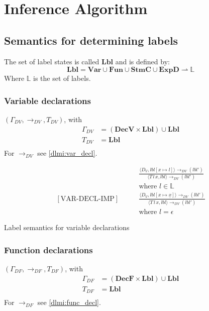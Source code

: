 
\newcommand{\iVar}{\mathbf{Var}}
\newcommand{\iFun}{\mathbf{Fun}}
\newcommand{\iDecv}{\mathbf{DecV}}
\newcommand{\iDecf}{\mathbf{DecF}}
\newcommand{\iStmc}{\mathbf{StmC}}
\newcommand{\iExpd}{\mathbf{ExpD}}
\newcommand{\iLbl}{\mathbf{Lbl}}

\newcommand{\trtspc}{\hspace{2em}} %

\section{Inference Algorithm}

\subsection{Semantics for determining labels}
The set of label states is called $\iLbl$ and is defined by:
\[
  \iLbl = \iVar \cup \iFun \cup \iStmc \cup \iExpd \rightharpoonup \mathbb{L}
\]
Where $\mathbb{L}$ is the set of labels.

\subsubsection{Variable declarations}
$(\Gamma_{DV}, \rightarrow_{DV}, T_{DV})$, with
\begin{align*}
  \Gamma_{DV} & = (\iDecv \times \iLbl) \cup \iLbl \\
  T_{DV} & = \iLbl \\
\end{align*}
For $\rightarrow_{DV}$ see \cref{dlmi:var_decl}.

\begin{table}
\begin{align*}
  [\text{VAR-DECL-EXP}] \trtspc & \frac{
    \langle D_V, lbl[x \mapsto l] \rangle \rightarrow_{DV} (lbl')
  }{
    \langle T \, l \, x, lbl \rangle \rightarrow_{DV} (lbl')
  }\\
  & \text{where } l \in \mathbb{L}\\[2em]
  [\text{VAR-DECL-IMP}] \trtspc & \frac{
    \langle D_V, lbl[x \mapsto \underline{x}] \rangle \rightarrow_{DV} (lbl')
  }{
    \langle T \, l \, x, lbl \rangle \rightarrow_{DV} (lbl')
  }\\
  & \text{where } l = \epsilon
\end{align*}
\caption{Label semantics for variable declarations}
\label{dlmi:var_decl}
\end{table}

\subsubsection{Function declarations}

$(\Gamma_{DF}, \rightarrow_{DF}, T_{DF})$, with
\begin{align*}
  \Gamma_{DF} & = (\iDecf \times \iLbl) \cup \iLbl \\
  T_{DF} & = \iLbl \\
\end{align*}
For $\rightarrow_{DF}$ see \cref{dlmi:func_decl}.


